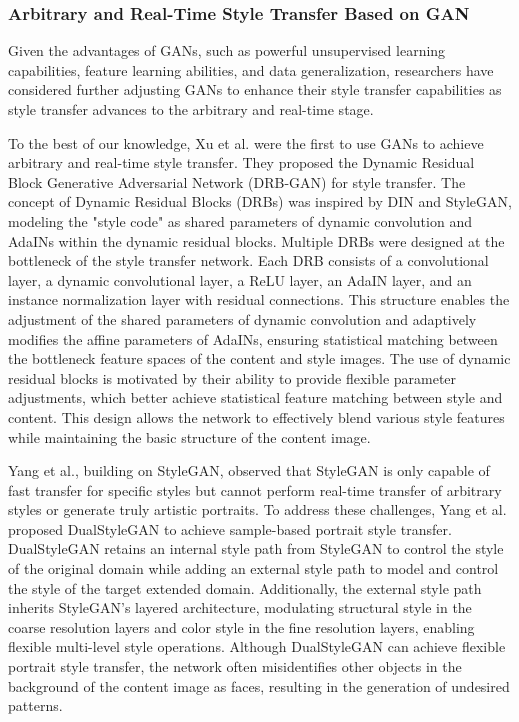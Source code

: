 \documentclass[preprint,12pt]{elsarticle}
\begin{document}
\subsubsection{Arbitrary and Real-Time Style Transfer Based on GAN}

Given the advantages of GANs, such as powerful unsupervised learning capabilities, feature learning abilities, and data generalization, researchers have considered further adjusting GANs to enhance their style transfer capabilities as style transfer advances to the arbitrary and real-time stage.

To the best of our knowledge, Xu et al.\citep{44xu2021drb} were the first to use GANs to achieve arbitrary and real-time style transfer. They proposed the Dynamic Residual Block Generative Adversarial Network (DRB-GAN) for style transfer. The concept of Dynamic Residual Blocks (DRBs) was inspired by DIN and StyleGAN, modeling the "style code" as shared parameters of dynamic convolution and AdaINs within the dynamic residual blocks. Multiple DRBs were designed at the bottleneck of the style transfer network. Each DRB consists of a convolutional layer, a dynamic convolutional layer, a ReLU layer, an AdaIN layer, and an instance normalization layer with residual connections. This structure enables the adjustment of the shared parameters of dynamic convolution and adaptively modifies the affine parameters of AdaINs, ensuring statistical matching between the bottleneck feature spaces of the content and style images. The use of dynamic residual blocks is motivated by their ability to provide flexible parameter adjustments, which better achieve statistical feature matching between style and content. This design allows the network to effectively blend various style features while maintaining the basic structure of the content image.

Yang et al.\citep{45yang2022pastiche}, building on StyleGAN\citep{19karras2019style}, observed that StyleGAN is only capable of fast transfer for specific styles but cannot perform real-time transfer of arbitrary styles or generate truly artistic portraits. To address these challenges, Yang et al. proposed DualStyleGAN to achieve sample-based portrait style transfer. DualStyleGAN retains an internal style path from StyleGAN to control the style of the original domain while adding an external style path to model and control the style of the target extended domain. Additionally, the external style path inherits StyleGAN's layered architecture, modulating structural style in the coarse resolution layers and color style in the fine resolution layers, enabling flexible multi-level style operations. Although DualStyleGAN can achieve flexible portrait style transfer, the network often misidentifies other objects in the background of the content image as faces, resulting in the generation of undesired patterns.
\end{document}
